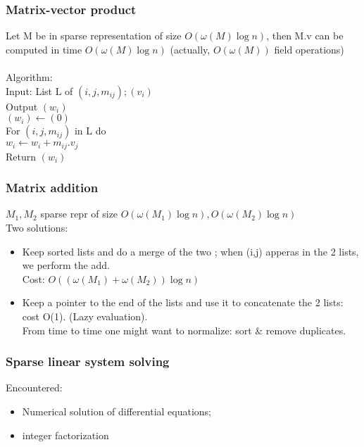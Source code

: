 \documentclass{article}
\theoremstyle{definition}
\theoremstyle{remark}
\begin{document}
\subsubsection{Matrix-vector product}
Let M be in sparse representation of size $O(\omega(M)\log n)$, then M.v can be computed in time $O(\omega(M)\log n)$ (actually, $O(\omega(M))$ field operations)\\\\
Algorithm:\\
Input: List L of $(i,j,m_{ij}) ; (v_i)$\\
Output $(w_i)$\\
$(w_i) \leftarrow (0)$\\
For $(i,j,m_{ij})$ in L do\\
\indent $w_i \leftarrow w_i + m_{ij}.v_j$\\
Return $(w_i)$

\subsubsection{Matrix addition}
$M_1,M_2$ sparse repr of size $O(\omega(M_1)\log n), O(\omega(M_2)\log n)$\\

Two solutions:\begin{itemize}
	\item Keep sorted lists and do a merge of the two ; when (i,j) apperas in the 2 lists, we perform the add.\\
	Cost: $O((\omega(M_1)+\omega(M_2))\log n)$
	\item Keep a pointer to the end of the lists and use it to concatenate the 2 lists: cost O(1). (Lazy evaluation).\\
	From time to time one might want to normalize: sort \& remove duplicates.
\end{itemize}

\subsubsection{Sparse linear system solving}
Encountered:\begin{itemize}
	\item Numerical solution of differential equations;
	\item integer factorization
\end{itemize}
\end{document}
